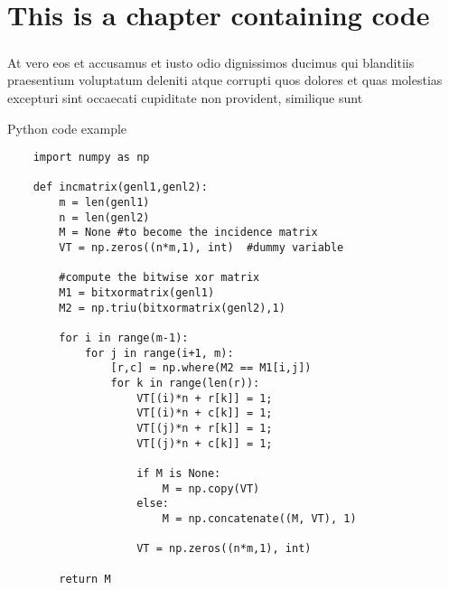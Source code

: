 \chapter{This is a chapter containing code}
    \paragraph{}
    At vero eos et accusamus et iusto odio dignissimos ducimus qui blanditiis praesentium voluptatum deleniti atque
    corrupti quos dolores et quas molestias excepturi sint occaecati cupiditate non provident, similique sunt 

    \begin{listing}[ht]
    \caption{Python code example}
    \label{listing:python example}

    \begin{verbatim}
    import numpy as np
        
    def incmatrix(genl1,genl2):
        m = len(genl1)
        n = len(genl2)
        M = None #to become the incidence matrix
        VT = np.zeros((n*m,1), int)  #dummy variable
        
        #compute the bitwise xor matrix
        M1 = bitxormatrix(genl1)
        M2 = np.triu(bitxormatrix(genl2),1) 
        
        for i in range(m-1):
            for j in range(i+1, m):
                [r,c] = np.where(M2 == M1[i,j])
                for k in range(len(r)):
                    VT[(i)*n + r[k]] = 1;
                    VT[(i)*n + c[k]] = 1;
                    VT[(j)*n + r[k]] = 1;
                    VT[(j)*n + c[k]] = 1;
        
                    if M is None:
                        M = np.copy(VT)
                    else:
                        M = np.concatenate((M, VT), 1)
        
                    VT = np.zeros((n*m,1), int)
        
        return M
    \end{verbatim}
    \end{listing}

\newpage
